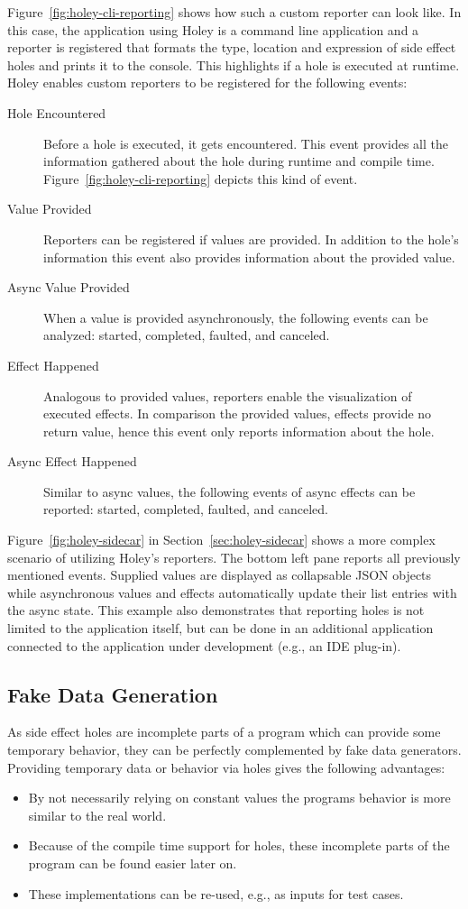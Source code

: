 Figure~\ref{fig:holey-cli-reporting} shows how such a custom reporter can look like.
In this case, the application using Holey is a command line application and a reporter is registered that formats the type, location and expression of side effect holes and prints it to the console.
This highlights if a hole is executed at runtime.
Holey enables custom reporters to be registered for the following events:
\begin{description}
    \item[Hole Encountered] Before a hole is executed, it gets encountered. This event provides all the information gathered about the hole during runtime and compile time. Figure~\ref{fig:holey-cli-reporting} depicts this kind of event.
    \item[Value Provided] Reporters can be registered if values are provided. In addition to the hole's information this event also provides information about the provided value.
    \item[Async Value Provided] When a value is provided asynchronously, the following events can be analyzed: started, completed, faulted, and canceled.
    \item[Effect Happened] Analogous to provided values, reporters enable the visualization of executed effects. In comparison the provided values, effects provide no return value, hence this event only reports information about the hole.
    \item[Async Effect Happened] Similar to async values, the following events of async effects can be reported: started, completed, faulted, and canceled.
\end{description}
Figure~\ref{fig:holey-sidecar} in Section~\ref{sec:holey-sidecar} shows a more complex scenario of utilizing Holey's reporters.
The bottom left pane reports all previously mentioned events.
Supplied values are displayed as collapsable JSON objects while asynchronous values and effects automatically update their list entries with the async state.
This example also demonstrates that reporting holes is not limited to the application itself, but can be done in an additional application connected to the application under development (e.g., an IDE plug-in).

\subsection{Fake Data Generation}
\label{sec:holey-fake-data-generation}
As side effect holes are incomplete parts of a program which can provide some temporary behavior, they can be perfectly complemented by fake data generators.
Providing temporary data or behavior via holes gives the following advantages:
\begin{itemize}
    \item By not necessarily relying on constant values the programs behavior is more similar to the real world.
    \item Because of the compile time support for holes, these incomplete parts of the program can be found easier later on.
    \item These implementations can be re-used, e.g., as inputs for test cases.
\end{itemize}


